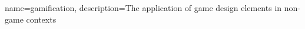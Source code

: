 \makenoidxglossaries

{
	name=gamification,
	description={The application of game design elements in non-game contexts \parencite{Gamification}}
}

